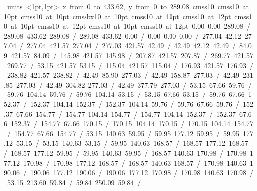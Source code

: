 \hbox{\beginpicture
\setcoordinatesystem units <1pt,1pt>
\setplotarea x from 0 to 433.62, y from 0 to 289.08
\setlinear
\font\picfont cmss10\picfont
\font\picfont cmss10 at 10pt\picfont
\font\picfont cmss10 at 10pt\picfont
\font\picfont cmssbx10 at 10pt\picfont
\font\picfont cmss10 at 10pt\picfont
\font\picfont cmss10 at 12pt\picfont
\font\picfont cmss10 at 10pt\picfont
\font\picfont cmss10 at 12pt\picfont
\font\picfont cmss10 at 10pt\picfont
\font\picfont cmss10 at 12pt\picfont
\setsolid
{} 0.00 0.00 289.08 /
 289.08 433.62 289.08 /
 289.08 433.62 0.00 /
 0.00 0.00 0.00 /
\setsolid
{} 277.04 42.12 277.04 /
 277.04 421.57 277.04 /
 277.03 421.57 42.49 /
 42.49 42.12 42.49 /
\setsolid
{} 84.09 421.57 84.09 /
\setsolid
{} 145.98 421.57 145.98 /
\setsolid
{} 207.87 421.57 207.87 /
\setsolid
{} 269.77 421.57 269.77 /
\setsolid
{} 53.15 421.57 53.15 /
\setsolid
{} 115.04 421.57 115.04 /
\setsolid
{} 176.93 421.57 176.93 /
\setsolid
{} 238.82 421.57 238.82 /
\setsolid
{} 42.49 85.90 277.03 /
\setsolid
{} 42.49 158.87 277.03 /
\setsolid
{} 42.49 231.85 277.03 /
\setsolid
{} 42.49 304.82 277.03 /
\setsolid
{} 42.49 377.79 277.03 /
\setsolid
{} 53.15 67.66 59.76 /
 59.76 104.14 59.76 /
 59.76 104.14 53.15 /
 53.15 67.66 53.15 /
\setsolid
{} 59.76 67.66 152.37 /
 152.37 104.14 152.37 /
 152.37 104.14 59.76 /
 59.76 67.66 59.76 /
\setsolid
{} 152.37 67.66 154.77 /
 154.77 104.14 154.77 /
 154.77 104.14 152.37 /
 152.37 67.66 152.37 /
\setsolid
{} 154.77 67.66 170.15 /
 170.15 104.14 170.15 /
 170.15 104.14 154.77 /
 154.77 67.66 154.77 /
\setsolid
{} 53.15 140.63 59.95 /
 59.95 177.12 59.95 /
 59.95 177.12 53.15 /
 53.15 140.63 53.15 /
\setsolid
{} 59.95 140.63 168.57 /
 168.57 177.12 168.57 /
 168.57 177.12 59.95 /
 59.95 140.63 59.95 /
\setsolid
{} 168.57 140.63 170.98 /
 170.98 177.12 170.98 /
 170.98 177.12 168.57 /
 168.57 140.63 168.57 /
\setsolid
{} 170.98 140.63 190.06 /
 190.06 177.12 190.06 /
 190.06 177.12 170.98 /
 170.98 140.63 170.98 /
\setsolid
{} 53.15 213.60 59.84 /
 59.84 250.09 59.84 /
}
